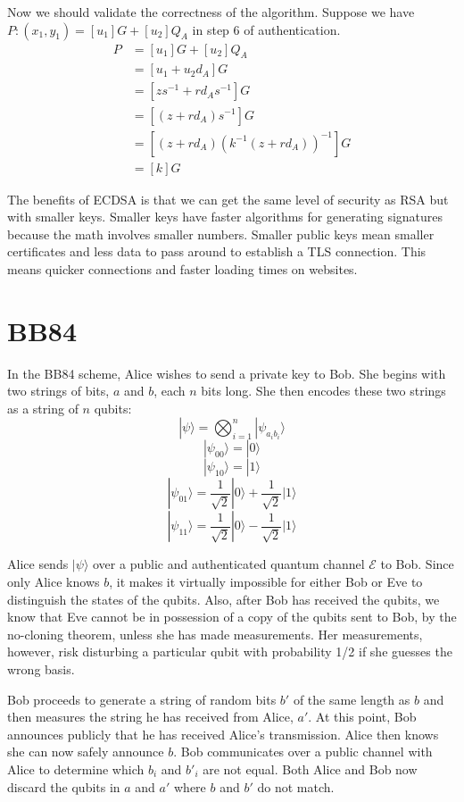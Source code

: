 \documentclass{article}
\begin{document}
Now we should validate the correctness of the algorithm. Suppose we have $P:(x_1,y_1)=[u_1]G+[u_2]Q_A$ in step 6 of authentication. 
\begin{align*}
P&=[u_1]G+[u_2]Q_A\\
&=[u_1+u_2d_A]G\\
&=[zs^{-1}+rd_As^{-1}]G\\
&=[(z+rd_A)s^{-1}]G\\
&=[(z+rd_A)(k^{-1}(z+rd_A))^{-1}]G\\
&=[k]G
\end{align*}

The benefits of ECDSA is that we can get the same level of security as RSA but with smaller keys. Smaller keys have faster algorithms for generating signatures because the math involves smaller numbers. Smaller public keys mean smaller certificates and less data to pass around to establish a TLS connection. This means quicker connections and faster loading times on websites.

\section{BB84}
In the BB84 scheme, Alice wishes to send a private key to Bob. She begins with two strings of bits, $a$ and $b$, each $n$ bits long. She then encodes these two strings as a string of $n$ qubits:
$$|\psi\rangle=\bigotimes_{i=1}^n|\psi_{a_ib_i}\rangle$$
$$|\psi_{00}\rangle=|0\rangle$$
$$|\psi_{10}\rangle=|1\rangle$$
$$|\psi_{01}\rangle=\frac{1}{\sqrt{2}}|0\rangle+\frac{1}{\sqrt{2}}|1\rangle$$
$$|\psi_{11}\rangle=\frac{1}{\sqrt{2}}|0\rangle-\frac{1}{\sqrt{2}}|1\rangle$$

Alice sends $|\psi \rangle$  over a public and authenticated quantum channel $\mathcal {E}$ to Bob. Since only Alice knows $b$, it makes it virtually impossible for either Bob or Eve to distinguish the states of the qubits. Also, after Bob has received the qubits, we know that Eve cannot be in possession of a copy of the qubits sent to Bob, by the no-cloning theorem, unless she has made measurements. Her measurements, however, risk disturbing a particular qubit with probability 1/2 if she guesses the wrong basis.

Bob proceeds to generate a string of random bits $b'$ of the same length as $b$ and then measures the string he has received from Alice, $a'$. At this point, Bob announces publicly that he has received Alice's transmission. Alice then knows she can now safely announce $b$. Bob communicates over a public channel with Alice to determine which $b_{i}$ and $b'_{i}$ are not equal. Both Alice and Bob now discard the qubits in $a$ and $a'$ where $b$ and $b'$ do not match.
\end{document}

